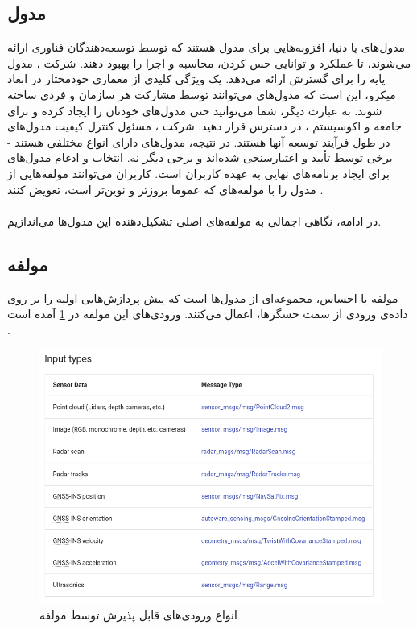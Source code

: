 \subsection{مدول }
مدول‌های  یا دنیا، افزونه‌هایی برای مدول  هستند که توسط توسعه‌دهندگان فناوری ارائه می‌شوند، تا عملکرد و توانایی حس کردن، محاسبه و اجرا را بهبود دهند. شرکت ، مدول پایه  را برای گسترش ارائه می‌دهد. یک ویژگی کلیدی از معماری خودمختار در ابعاد میکرو، این است که مدول‌های  می‌توانند توسط مشارکت هر سازمان و فردی ساخته شوند. به عبارت دیگر، شما می‌توانید حتی مدول‌های خودتان را ایجاد کرده و برای جامعه و اکوسیستم ، در دسترس قرار دهید. شرکت ، مسئول کنترل کیفیت مدول‌های  در طول فرآیند توسعه آنها هستند. در نتیجه، مدول‌های  دارای انواع مختلفی هستند - برخی توسط  تأیید و اعتبارسنجی شده‌اند و برخی دیگر نه. انتخاب و ادغام مدول‌های  برای ایجاد برنامه‌های نهایی به عهده کاربران  است. کاربران می‌توانند مولفه‌هایی از مدول  را با مولفه‌های  که عموما بروزتر و نوین‌تر است، تعویض کنند \cite{Autoware:Documentation}.\\
\\
در ادامه، نگاهی اجمالی به مولفه‌های اصلی تشکیل‌دهنده این مدول‌ها می‌اندازیم.

\subsection{مولفه }
مولفه  یا احساس، مجموعه‌ای از مدول‌ها است که پیش‌ پردازش‌هایی اولیه را بر روی داده‌ی ورودی از سمت حسگر‌ها، اعمال می‌کنند. ورودی‌های این مولفه در \cref{fig:Sensing_Input_Types} آمده است \cite{Autoware:Documentation}.

\begin{figure}[h!]
    \centering
    \includegraphics[width=0.64\linewidth]{figures/Sensing_Input_Types.png}
    \caption{انواع ورودی‌های قابل پذیرش توسط مولفه  \cite{Autoware:Documentation}}
    \label{fig:Sensing_Input_Types}
\end{figure}

